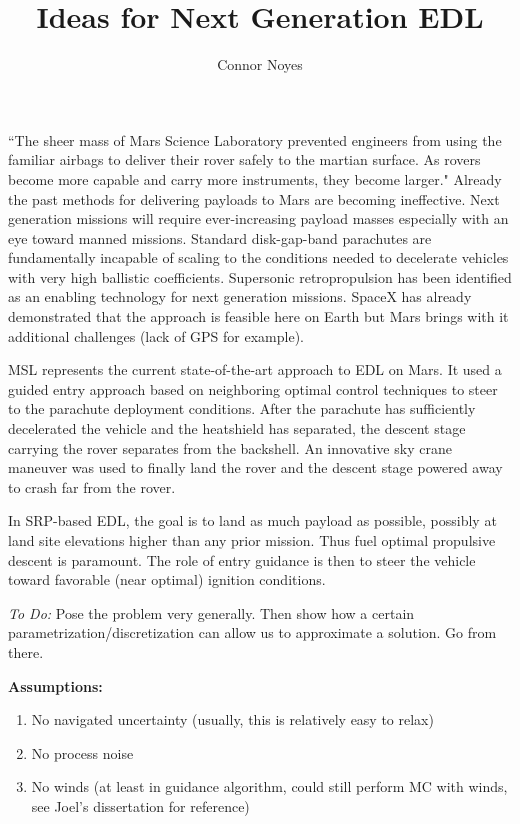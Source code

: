 \documentclass[10pt,a4paper]{article}
\author{Connor Noyes}
\title{Ideas for Next Generation EDL}
\begin{document}

	
	``The sheer mass of Mars Science Laboratory prevented engineers from using the familiar airbags to deliver their rover safely to the martian surface. As rovers become more capable and carry more instruments, they become larger." Already the past methods for delivering payloads to Mars are becoming ineffective. Next generation missions will require ever-increasing payload masses especially with an eye toward manned missions. Standard disk-gap-band parachutes are fundamentally incapable of scaling to the conditions needed to decelerate vehicles with very high ballistic coefficients. Supersonic retropropulsion has been identified as an enabling technology for next generation missions. SpaceX has already demonstrated that the approach is feasible here on Earth but Mars brings with it additional challenges (lack of GPS for example). 
	
	MSL represents the current state-of-the-art approach to EDL on Mars. It used a guided entry approach based on neighboring optimal control techniques to steer to the parachute deployment conditions. After the parachute has sufficiently decelerated the vehicle and the heatshield has separated, the descent stage carrying the rover separates from the backshell. An innovative sky crane maneuver was used to finally land the rover and the descent stage powered away to crash far from the rover. 
	
	In SRP-based EDL, the goal is to land as much payload as possible, possibly at land site elevations higher than any prior mission. Thus fuel optimal propulsive descent is paramount. The role of entry guidance is then to steer the vehicle toward favorable (near optimal) ignition conditions. 
	
	\textit{To Do:} Pose the problem very generally. Then show how a certain parametrization/discretization can allow us to approximate a solution. Go from there. 
	
\textbf{	Assumptions: }
	\begin{enumerate}
	\item No navigated uncertainty (usually, this is relatively easy to relax)
	\item No process noise
	\item No winds (at least in guidance algorithm, could still perform MC with winds, see Joel's dissertation for reference)
	\end{enumerate}
	
\end{document}
